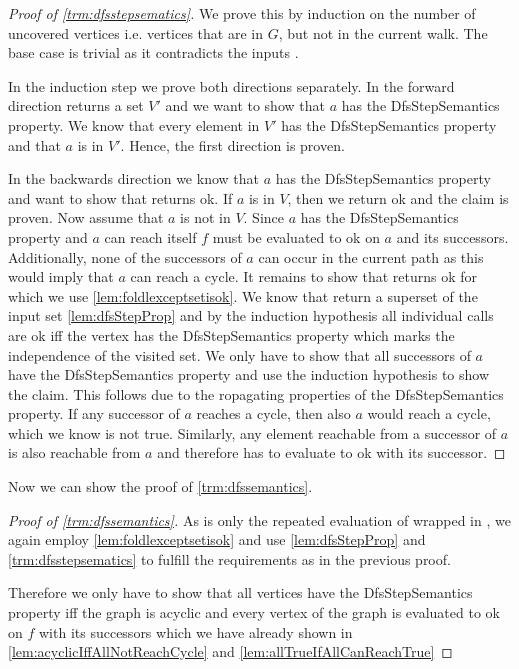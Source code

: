 \begin{proof}[Proof of \cref{trm:dfsstepsematics}]
  We prove this by induction on the number of uncovered vertices i.e. vertices that are in $G$, but not in the current walk. The base case is trivial as it contradicts the inputs \dfsstep.

  In the induction step we prove both directions separately. In the forward direction \dfsstep returns a set $V'$ and we want to show that $a$ has the DfsStepSemantics property. We know that every element in  $V'$ has the DfsStepSemantics property and that $a$ is in $V'$. Hence, the first direction is proven.

  In the backwards direction we know that $a$ has the DfsStepSemantics property and want to show that \dfsstep returns ok. If $a$ is in $V$, then we return ok and the claim is proven. Now assume that $a$ is not in $V$. Since $a$ has the DfsStepSemantics property and $a$ can reach itself $f$ must be evaluated to ok on $a$ and its successors. Additionally, none of the successors of $a$ can occur in the current path as this would imply that $a$ can reach a cycle. 
  It remains to show that \foldlexceptset returns ok for which we use \cref{lem:foldlexceptsetisok}. We know that \dfsstep return a superset of the input set \cref{lem:dfsStepProp} and by the induction hypothesis all individual calls are ok iff the vertex has the DfsStepSemantics property which marks the independence of the visited set. We only have to show that all successors of $a$ have the DfsStepSemantics property and use the induction hypothesis to show the claim. This follows due to the ropagating properties of the DfsStepSemantics property. If any successor of $a$ reaches a cycle, then also $a$ would reach a cycle, which we know is not true. Similarly, any element reachable from a successor of $a$ is also reachable from $a$ and therefore has to evaluate to ok with its successor.
\end{proof}

Now we can show the proof of \cref{trm:dfssemantics}.

\begin{proof}[Proof of \cref{trm:dfssemantics}]
  As \dfs is only the repeated evaluation of \dfsstep wrapped in \foldlexceptset, we again employ \cref{lem:foldlexceptsetisok} and use \cref{lem:dfsStepProp} and \cref{trm:dfsstepsematics} to fulfill the requirements as in the previous proof. 

  Therefore we only have to show that all vertices have the DfsStepSemantics property iff the graph is acyclic and every vertex of the graph is evaluated to ok on $f$ with its successors which we have already shown in \cref{lem:acyclicIffAllNotReachCycle} and \cref{lem:allTrueIfAllCanReachTrue}
\end{proof}


